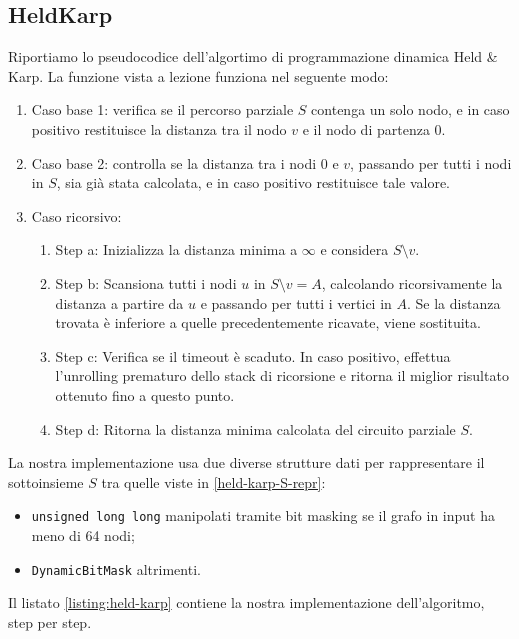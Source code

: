 \subsection{HeldKarp}

Riportiamo lo pseudocodice dell'algortimo di programmazione dinamica Held \& Karp. La funzione  vista a lezione funziona nel seguente modo:

\begin{enumerate}
    \item Caso base 1: verifica se il percorso parziale $S$ contenga un solo nodo, e in caso positivo restituisce la distanza tra il nodo $v$ e il nodo di partenza $0$.
    \item Caso base 2: controlla se la distanza tra i nodi $0$ e $v$, passando per tutti i nodi in $S$, sia già stata calcolata, e in caso positivo restituisce tale valore.
    \item Caso ricorsivo:
    \begin{enumerate}
        \item Step a: Inizializza la distanza minima a $\infty$ e considera $S \setminus {v}$.
        \item Step b: Scansiona tutti i nodi $u$ in $S \setminus {v} = A$, calcolando ricorsivamente la distanza a partire da $u$ e passando per tutti i vertici in $A$. Se la distanza trovata è inferiore a quelle precedentemente ricavate, viene sostituita.
        \item Step c: Verifica se il timeout è scaduto. In caso positivo, effettua l'unrolling prematuro dello stack di ricorsione e ritorna il miglior risultato ottenuto fino a questo punto.
        \item Step d: Ritorna la distanza minima calcolata del circuito parziale $S$.
    \end{enumerate}
\end{enumerate}

\noindent La nostra implementazione usa due diverse strutture dati per rappresentare il sottoinsieme $S$ tra quelle viste in \ref{held-karp-S-repr}:

\begin{itemize}
    \item \texttt{unsigned long long} manipolati tramite bit masking se il grafo in input ha meno di 64 nodi;
    \item \texttt{DynamicBitMask} altrimenti.
\end{itemize}

\noindent Il listato \ref{listing:held-karp} contiene la nostra implementazione dell'algoritmo, step per step.

